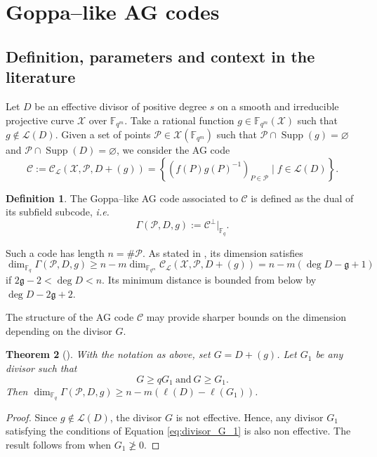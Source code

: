 \documentclass[a4paper]{article}
\newtheorem{thm}{Theorem}[section]
\theoremstyle{definition}
\newtheorem{definition}[thm]{Definition}
\theoremstyle{remark}
\newcommand{\calP}{\mathcal{P}}
\newcommand{\calL}{\mathcal{L}}
\newcommand{\calC}{\mathcal{C}}
\newcommand{\calX}{\mathcal{X}}
\newcommand{\fqm}{\mathbb{F}_{q^m}}
\newcommand{\fq}{\mathbb{F}_{q}}
\newcommand{\set}[1]{\left\{#1\right\}}
\newcommand{\Supp}{\operatorname{Supp}}
\begin{document}
\section{Goppa--like AG codes}\label{sec:Goppa}
\subsection{Definition, parameters and context in the literature}\label{subsec:def-Goppa}
Let $D$ be an effective divisor of positive degree $s$ on a smooth and irreducible projective curve $\calX$ over $\fqm$. Take a rational function $g \in \fqm(\calX)$ such that $g \notin \calL(D)$. Given a set of points $\calP \in \calX(\fqm)$ such that $\calP \cap \Supp(g) = \varnothing$ and $\calP \cap \Supp(D) = \varnothing$, we consider the AG code
\[\calC := \calC_{\calL}(\calX,\calP,D+(g))=\set{\left(f(P)g(P)^{-1}\right)_{P \in \calP} \mid f \in \calL(D)}.\]
\begin{definition} \label{def:Goppa--like_AG_code}
The Goppa--like AG code associated to $\calC$ is defined as the dual of its subfield subcode, \emph{i.e.}
\[ \Gamma(\calP,D,g) := \calC^{\perp}|_{\fq}.\]
\end{definition}%
%
Such a code has length $n = \# \calP$. As stated in \cite[Theorem~1]{JM96}, its dimension satisfies 
\[\dim_{\fq} \Gamma(\calP,D,g) \geq n-m \dim_{\fqm} \calC_{\calL}(\calX,\calP,D+(g)) =n-m(\deg D - \mathfrak{g} +1 )\]
if $2\mathfrak{g} - 2 < \deg D < n$. Its minimum distance is bounded from below by $\deg D - 2 \mathfrak{g} + 2$.

The structure of the AG code $\calC$ may provide sharper bounds on the dimension depending on the divisor $G$.

\begin{thm}[{\cite[Theorem~9.1.6]{Sti09}}]
With the notation as above, set $G=D+(g)$. Let $G_1$ be any divisor such that 
\begin{equation} \label{eq:divisor_G_1}
G \geq qG_1 \ \mathrm{and} \ G \geq G_1.
\end{equation}
Then $\dim_{\fq} \Gamma(\calP,D,g)  \geq n-m\left(\ell(D) - \ell(G_1)\right)$.

\end{thm}

\begin{proof}
Since $g \notin \calL(D)$, the divisor $G$ is not effective. Hence, any divisor $G_1$ satisfying the conditions of Equation \ref{eq:divisor_G_1} is also non effective. The result follows from {\cite[Theorem~9.1.6]{Sti09}} when $G_1\not\geq 0$.
\end{proof}
\end{document}
